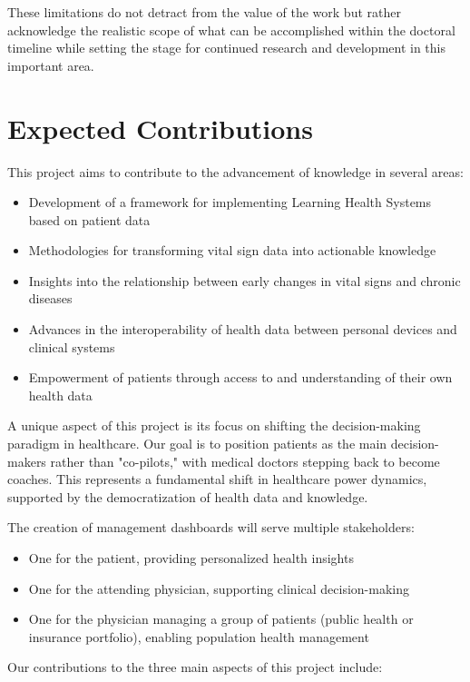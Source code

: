 These limitations do not detract from the value of the work but rather acknowledge the realistic scope of what can be accomplished within the doctoral timeline while setting the stage for continued research and development in this important area.

\section{Expected Contributions} \label{sec:contributions}

This project aims to contribute to the advancement of knowledge in several areas:

\begin{itemize}
\item Development of a framework for implementing Learning Health Systems based on patient data
\item Methodologies for transforming vital sign data into actionable knowledge
\item Insights into the relationship between early changes in vital signs and chronic diseases
\item Advances in the interoperability of health data between personal devices and clinical systems
\item Empowerment of patients through access to and understanding of their own health data
\end{itemize}

A unique aspect of this project is its focus on shifting the decision-making paradigm in healthcare. Our goal is to position patients as the main decision-makers rather than "co-pilots," with medical doctors stepping back to become coaches. This represents a fundamental shift in healthcare power dynamics, supported by the democratization of health data and knowledge.

The creation of management dashboards will serve multiple stakeholders:
\begin{itemize}
\item One for the patient, providing personalized health insights
\item One for the attending physician, supporting clinical decision-making
\item One for the physician managing a group of patients (public health or insurance portfolio), enabling population health management
\end{itemize}

Our contributions to the three main aspects of this project include:

